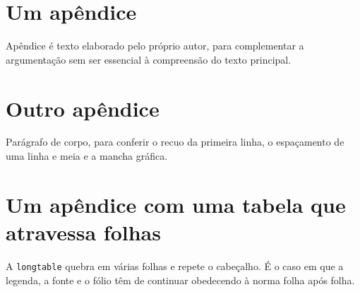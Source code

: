 \documentclass[dsc,pdfa,coorientador,numbers,twoside,orientadorexamina]{coppe}
\begin{document}
  \appendix
  \chapter{Um apêndice}
  Apêndice é texto elaborado pelo próprio autor, para complementar a argumentação sem ser essencial à compreensão do texto principal.
  \chapter{Outro apêndice}
  Parágrafo de corpo, para conferir o recuo da primeira linha, o espaçamento de uma linha e meia e a mancha gráfica.
  \chapter{Um apêndice com uma tabela que atravessa folhas}
  A \texttt{longtable} quebra em várias folhas e repete o cabeçalho.
  É o caso em que a legenda, a fonte e o fólio têm de continuar
  obedecendo à norma folha após folha.
\end{document}
